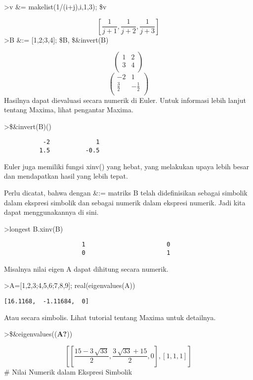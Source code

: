 \documentclass[
]{book}
\begin{document}
\textgreater v \&= makelist(1/(i+j),i,1,3); \$v

\[\left[ \frac{1}{j+1} , \frac{1}{j+2} , \frac{1}{j+3} \right]\]\textgreater B \&:= {[}1,2;3,4{]}; \$B, \$\&invert(B)

\[\begin{pmatrix}1 & 2 \\ 3 & 4 \\ \end{pmatrix}\] \[\begin{pmatrix}-2 & 1 \\ \frac{3}{2} & -\frac{1}{2} \\ \end{pmatrix}\]Hasilnya dapat dievaluasi secara numerik di Euler. Untuk informasi lebih lanjut tentang Maxima, lihat pengantar Maxima.

\textgreater\$\&invert(B)()

\begin{verbatim}
           -2             1 
          1.5          -0.5 
\end{verbatim}

Euler juga memiliki fungsi xinv() yang hebat, yang melakukan upaya lebih besar dan mendapatkan hasil yang lebih tepat.

Perlu dicatat, bahwa dengan \&:= matriks B telah didefinisikan sebagai simbolik dalam ekspresi simbolik dan sebagai numerik dalam ekspresi numerik. Jadi kita dapat menggunakannya di sini.

\textgreater longest B.xinv(B)

\begin{verbatim}
                      1                       0 
                      0                       1 
\end{verbatim}

Misalnya nilai eigen A dapat dihitung secara numerik.

\textgreater A={[}1,2,3;4,5,6;7,8,9{]}; real(eigenvalues(A))

\begin{verbatim}
[16.1168,  -1.11684,  0]
\end{verbatim}

Atau secara simbolis. Lihat tutorial tentang Maxima untuk detailnya.

\textgreater\$\&eigenvalues((\textbf{A?}))

\[\left[ \left[ \frac{15-3\,\sqrt{33}}{2} , \frac{3\,\sqrt{33}+15}{2}, 0 \right]  , \left[ 1 , 1 , 1 \right]  \right]\] \# Nilai Numerik dalam Ekspresi Simbolik
\end{document}
